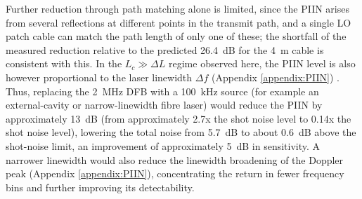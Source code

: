 Further reduction through path matching alone is limited, since the PIIN
arises from several reflections at different points in the transmit path,
and a single LO patch cable can match the path length of only one of these;
the shortfall of the measured reduction relative to the predicted
\SI{26.4}{dB} for the \SI{4}{m} cable is consistent with this. In the $L_c \gg \Delta L$ regime observed
here, the PIIN level is also however proportional to the laser linewidth $\Delta f$
(Appendix \ref{appendix:PIIN}) \cite{harris_role_1998}. Thus, replacing the
\SI{2}{MHz} DFB with a \SI{100}{kHz} source (for example an external-cavity
or narrow-linewidth fibre laser) would reduce the PIIN by approximately \SI{13}{dB} (from approximately 2.7x the shot noise level to 0.14x the shot noise level), lowering the total
noise from \SI{5.7}{dB} to about \SI{0.6}{dB} above the shot-noise limit,
an improvement of approximately \SI{5}{dB} in sensitivity. A narrower linewidth would also reduce the linewidth
broadening of the Doppler peak (Appendix \ref{appendix:PIIN}), concentrating the
return in fewer frequency bins and further improving its detectability.

